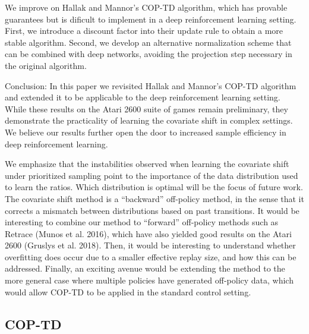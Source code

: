 \documentclass[12pt,a4paper,openright,twoside]{article}
\numberwithin{equation}{section}
\theoremstyle{definition}
\theoremstyle{remark}
\theoremstyle{plain}
\begin{document}
We improve on Hallak and Mannor’s COP-TD algorithm, which has provable guarantees but is dificult to implement in a deep reinforcement learning setting. First, we introduce a discount factor into their update rule to obtain a more stable algorithm. Second, we develop an alternative normalization scheme that can be combined with deep networks, avoiding the projection step necessary in the original algorithm.

Conclusion: In this paper we revisited Hallak and Mannor’s COP-TD algorithm and extended it to be applicable to the deep reinforcement learning setting. While these results on the Atari 2600 suite of games remain preliminary, they demonstrate the practicality of learning the covariate shift in complex settings. We believe our results further open the door to increased sample efficiency in deep reinforcement learning.

We emphasize that the instabilities observed when learning the covariate shift under prioritized sampling point to the importance of the data distribution used to learn the ratios. Which distribution is optimal will be the focus of future work. The covariate shift method is a “backward” off-policy method, in the sense that it corrects a mismatch between distributions based on past transitions. It would be interesting to combine our method to “forward” off-policy methods such as Retrace (Munos et al. 2016), which have also yielded good results on the Atari 2600 (Gruslys et al. 2018). Then, it would be interesting to understand whether overfitting does occur due to a smaller effective replay size, and how this can be addressed. Finally, an exciting avenue would be extending the method to the more general case where multiple policies have generated off-policy data, which would allow COP-TD to be applied in the standard control setting.


\subsection{COP-TD}
\end{document}
